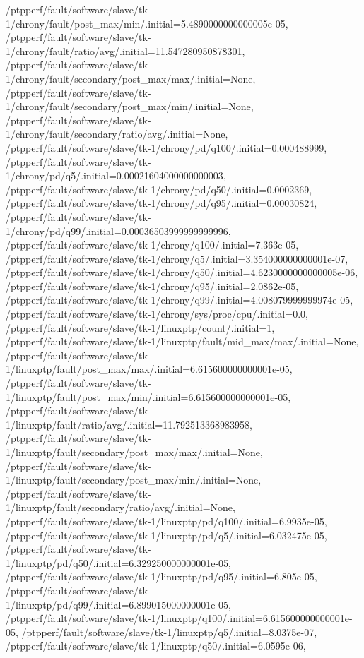 {    /ptpperf/fault/software/slave/tk-1/chrony/fault/post_max/min/.initial=5.4890000000000005e-05,
    /ptpperf/fault/software/slave/tk-1/chrony/fault/ratio/avg/.initial=11.547280950878301,
    /ptpperf/fault/software/slave/tk-1/chrony/fault/secondary/post_max/max/.initial=None,
    /ptpperf/fault/software/slave/tk-1/chrony/fault/secondary/post_max/min/.initial=None,
    /ptpperf/fault/software/slave/tk-1/chrony/fault/secondary/ratio/avg/.initial=None,
    /ptpperf/fault/software/slave/tk-1/chrony/pd/q100/.initial=0.000488999,
    /ptpperf/fault/software/slave/tk-1/chrony/pd/q5/.initial=0.00021604000000000003,
    /ptpperf/fault/software/slave/tk-1/chrony/pd/q50/.initial=0.0002369,
    /ptpperf/fault/software/slave/tk-1/chrony/pd/q95/.initial=0.00030824,
    /ptpperf/fault/software/slave/tk-1/chrony/pd/q99/.initial=0.00036503999999999996,
    /ptpperf/fault/software/slave/tk-1/chrony/q100/.initial=7.363e-05,
    /ptpperf/fault/software/slave/tk-1/chrony/q5/.initial=3.354000000000001e-07,
    /ptpperf/fault/software/slave/tk-1/chrony/q50/.initial=4.6230000000000005e-06,
    /ptpperf/fault/software/slave/tk-1/chrony/q95/.initial=2.0862e-05,
    /ptpperf/fault/software/slave/tk-1/chrony/q99/.initial=4.008079999999974e-05,
    /ptpperf/fault/software/slave/tk-1/chrony/sys/proc/cpu/.initial=0.0,
    /ptpperf/fault/software/slave/tk-1/linuxptp/count/.initial=1,
    /ptpperf/fault/software/slave/tk-1/linuxptp/fault/mid_max/max/.initial=None,
    /ptpperf/fault/software/slave/tk-1/linuxptp/fault/post_max/max/.initial=6.615600000000001e-05,
    /ptpperf/fault/software/slave/tk-1/linuxptp/fault/post_max/min/.initial=6.615600000000001e-05,
    /ptpperf/fault/software/slave/tk-1/linuxptp/fault/ratio/avg/.initial=11.792513368983958,
    /ptpperf/fault/software/slave/tk-1/linuxptp/fault/secondary/post_max/max/.initial=None,
    /ptpperf/fault/software/slave/tk-1/linuxptp/fault/secondary/post_max/min/.initial=None,
    /ptpperf/fault/software/slave/tk-1/linuxptp/fault/secondary/ratio/avg/.initial=None,
    /ptpperf/fault/software/slave/tk-1/linuxptp/pd/q100/.initial=6.9935e-05,
    /ptpperf/fault/software/slave/tk-1/linuxptp/pd/q5/.initial=6.032475e-05,
    /ptpperf/fault/software/slave/tk-1/linuxptp/pd/q50/.initial=6.329250000000001e-05,
    /ptpperf/fault/software/slave/tk-1/linuxptp/pd/q95/.initial=6.805e-05,
    /ptpperf/fault/software/slave/tk-1/linuxptp/pd/q99/.initial=6.899015000000001e-05,
    /ptpperf/fault/software/slave/tk-1/linuxptp/q100/.initial=6.615600000000001e-05,
    /ptpperf/fault/software/slave/tk-1/linuxptp/q5/.initial=8.0375e-07,
    /ptpperf/fault/software/slave/tk-1/linuxptp/q50/.initial=6.0595e-06,
}
